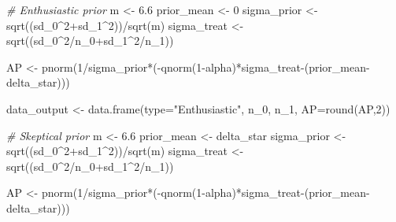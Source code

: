 \documentclass[
]{book}
\newenvironment{Shaded}{\begin{snugshade}}{\end{snugshade}}
\newcommand{\AttributeTok}[1]{\textcolor[rgb]{0.77,0.63,0.00}{#1}}
\newcommand{\CommentTok}[1]{\textcolor[rgb]{0.56,0.35,0.01}{\textit{#1}}}
\newcommand{\DecValTok}[1]{\textcolor[rgb]{0.00,0.00,0.81}{#1}}
\newcommand{\FloatTok}[1]{\textcolor[rgb]{0.00,0.00,0.81}{#1}}
\newcommand{\FunctionTok}[1]{\textcolor[rgb]{0.00,0.00,0.00}{#1}}
\newcommand{\NormalTok}[1]{#1}
\newcommand{\OtherTok}[1]{\textcolor[rgb]{0.56,0.35,0.01}{#1}}
\newcommand{\SpecialCharTok}[1]{\textcolor[rgb]{0.00,0.00,0.00}{#1}}
\newcommand{\StringTok}[1]{\textcolor[rgb]{0.31,0.60,0.02}{#1}}
\begin{document}
\begin{Shaded}
\begin{Highlighting}[]
\CommentTok{\# Enthusiastic prior}
\NormalTok{m }\OtherTok{\textless{}{-}} \FloatTok{6.6}
\NormalTok{prior\_mean }\OtherTok{\textless{}{-}} \DecValTok{0}
\NormalTok{sigma\_prior }\OtherTok{\textless{}{-}} \FunctionTok{sqrt}\NormalTok{((sd\_0}\SpecialCharTok{\^{}}\DecValTok{2}\SpecialCharTok{+}\NormalTok{sd\_1}\SpecialCharTok{\^{}}\DecValTok{2}\NormalTok{))}\SpecialCharTok{/}\FunctionTok{sqrt}\NormalTok{(m)}
\NormalTok{sigma\_treat }\OtherTok{\textless{}{-}} \FunctionTok{sqrt}\NormalTok{((sd\_0}\SpecialCharTok{\^{}}\DecValTok{2}\SpecialCharTok{/}\NormalTok{n\_0}\SpecialCharTok{+}\NormalTok{sd\_1}\SpecialCharTok{\^{}}\DecValTok{2}\SpecialCharTok{/}\NormalTok{n\_1))}

\NormalTok{AP }\OtherTok{\textless{}{-}} \FunctionTok{pnorm}\NormalTok{(}\DecValTok{1}\SpecialCharTok{/}\NormalTok{sigma\_prior}\SpecialCharTok{*}\NormalTok{(}\SpecialCharTok{{-}}\FunctionTok{qnorm}\NormalTok{(}\DecValTok{1}\SpecialCharTok{{-}}\NormalTok{alpha)}\SpecialCharTok{*}\NormalTok{sigma\_treat}\SpecialCharTok{{-}}\NormalTok{(prior\_mean}\SpecialCharTok{{-}}\NormalTok{delta\_star)))}

\NormalTok{data\_output }\OtherTok{\textless{}{-}} \FunctionTok{data.frame}\NormalTok{(}\AttributeTok{type=}\StringTok{"Enthusiastic"}\NormalTok{, n\_0, n\_1, }\AttributeTok{AP=}\FunctionTok{round}\NormalTok{(AP,}\DecValTok{2}\NormalTok{))}

\CommentTok{\# Skeptical prior}
\NormalTok{m }\OtherTok{\textless{}{-}} \FloatTok{6.6}
\NormalTok{prior\_mean }\OtherTok{\textless{}{-}}\NormalTok{ delta\_star}
\NormalTok{sigma\_prior }\OtherTok{\textless{}{-}} \FunctionTok{sqrt}\NormalTok{((sd\_0}\SpecialCharTok{\^{}}\DecValTok{2}\SpecialCharTok{+}\NormalTok{sd\_1}\SpecialCharTok{\^{}}\DecValTok{2}\NormalTok{))}\SpecialCharTok{/}\FunctionTok{sqrt}\NormalTok{(m)}
\NormalTok{sigma\_treat }\OtherTok{\textless{}{-}} \FunctionTok{sqrt}\NormalTok{((sd\_0}\SpecialCharTok{\^{}}\DecValTok{2}\SpecialCharTok{/}\NormalTok{n\_0}\SpecialCharTok{+}\NormalTok{sd\_1}\SpecialCharTok{\^{}}\DecValTok{2}\SpecialCharTok{/}\NormalTok{n\_1))}

\NormalTok{AP }\OtherTok{\textless{}{-}} \FunctionTok{pnorm}\NormalTok{(}\DecValTok{1}\SpecialCharTok{/}\NormalTok{sigma\_prior}\SpecialCharTok{*}\NormalTok{(}\SpecialCharTok{{-}}\FunctionTok{qnorm}\NormalTok{(}\DecValTok{1}\SpecialCharTok{{-}}\NormalTok{alpha)}\SpecialCharTok{*}\NormalTok{sigma\_treat}\SpecialCharTok{{-}}\NormalTok{(prior\_mean}\SpecialCharTok{{-}}\NormalTok{delta\_star)))}


\end{Highlighting}
\end{Shaded}
\end{document}
